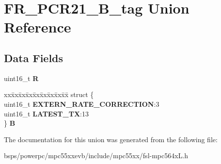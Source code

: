 \hypertarget{unionFR__PCR21__16B__tag}{}\section{F\+R\+\_\+\+P\+C\+R21\+\_\+B\+\_\+tag Union Reference}
\label{unionFR__PCR21__16B__tag}
\subsection*{Data Fields}
\begin{DoxyCompactItemize}
\item 
\mbox{\label{unionFR__PCR21__16B__tag_a553ba73cdce9db215842bdce000ae8f0}} 
uint16\+\_\+t {\bfseries R}
\item 
\mbox{\label{unionFR__PCR21__16B__tag_a31cd74125ad19e662a0776c0bed5017c}} 
\begin{tabbing}
xx\=xx\=xx\=xx\=xx\=xx\=xx\=xx\=xx\=\kill
struct \{\\
\>uint16\_t {\bfseries EXTERN\_RATE\_CORRECTION}:3\\
\>uint16\_t {\bfseries LATEST\_TX}:13\\
\} {\bfseries B}\\

\end{tabbing}\end{DoxyCompactItemize}


The documentation for this union was generated from the following file\+:\begin{DoxyCompactItemize}
\item 
bsps/powerpc/mpc55xxevb/include/mpc55xx/fsl-\/mpc564x\+L.\+h\end{DoxyCompactItemize}
